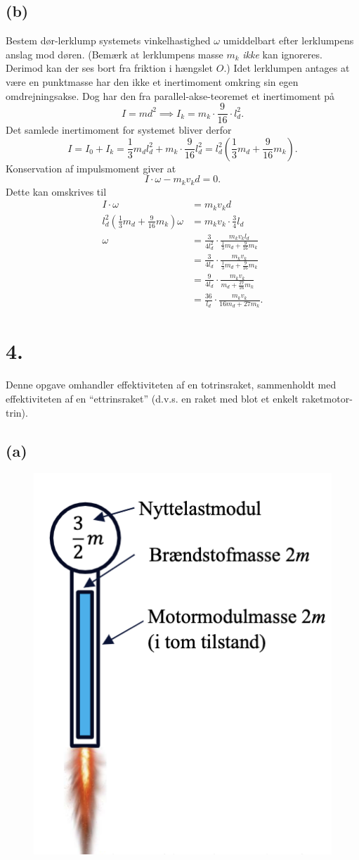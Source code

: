 \documentclass[12pt]{article}
\theoremstyle{definition}
\begin{document}
\subsection*{(b)}
Bestem dør-lerklump systemets vinkelhastighed $\omega$ umiddelbart efter lerklumpens anslag mod døren. (Bemærk at lerklumpens masse $m_k$ \textit{ikke} kan ignoreres. Derimod kan der ses bort fra friktion i hængslet $O$.)
\bigbreak
Idet lerklumpen antages at være en punktmasse har den ikke et inertimoment omkring sin egen omdrejningsakse. Dog har den fra parallel-akse-teoremet et inertimoment på 
\[ 
I = md^2 \implies I_k = m_k \cdot \frac{9}{16} \cdot l_d^2
.\]
Det samlede inertimoment for 
systemet bliver derfor
\[ 
I = I_0 + I_k = \frac{1}{3} m_d l_d^2 + m_k \cdot \frac{9}{16} l_d^2 = l_d^2 \left( \frac{1}{3}m_d + \frac{9}{16}m_k \right)
.\]
Konservation af impulsmoment giver at
\[ 
I \cdot \omega - m_k v_k d = 0
.\]
Dette kan omskrives til
\begin{align*}
  I \cdot \omega &= m_k v_k d \\
  l_d^2 \left( \frac{1}{3}m_d + \frac{9}{16}m_k \right) \omega &= m_k v_k \cdot \frac{3}{4}l_d  \\
  \omega &= \frac{3}{4l_d^2} \cdot \frac{m_k v_k l_d}{\frac{1}{3}m_d + \frac{9}{16}m_k} \\
  &= \frac{3}{4l_d}\cdot \frac{m_k v_k}{\frac{1}{3} m_d + \frac{9}{16}m_k} \\
  &= \frac{9}{4l_d} \cdot \frac{m_k v_k}{ m_d + \frac{27}{16}m_k} \\
  &= \frac{36}{l_d} \cdot \frac{m_k v_k}{16 m_d + 27 m_k}
.\end{align*}



\section*{4.}
Denne opgave omhandler effektiviteten af en totrinsraket, sammenholdt med effektiviteten af en “ettrinsraket” (d.v.s. en raket med blot et enkelt raketmotor-trin).


\subsection*{(a)}
\begin{figure} [ht]
  \centering
  \caption{}
  \includegraphics[width=0.15\linewidth]{../figures/Ek21_3.png}
  \label{fig:Ek21_3}
\end{figure}
\end{document}
